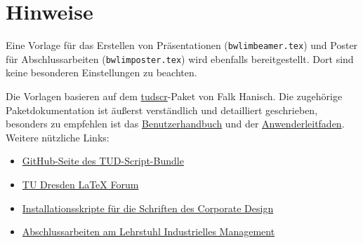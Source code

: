 \documentclass[final, english, ngerman, a4paper, 10pt, %
numbers=noenddot,
cd=true,
cdfont=false,cdfont=nohead,cdfont=nodin,
cdmath=false,
cdhead=false,
cdfoot=true,
cdcover=monochrome,
cdgeometry=symmetric,
declaration=heading,
declaration=notoc,
abstract=heading,
]{tudscrartcl}
\begin{document}
\section{Hinweise}

Eine Vorlage für das Erstellen von Präsentationen (\texttt{bwlimbeamer.tex}) und Poster für Abschlussarbeiten (\texttt{bwlimposter.tex}) wird ebenfalls bereitgestellt. Dort sind keine besonderen Einstellungen zu beachten.

Die Vorlagen basieren auf dem \href{https://www.ctan.org/pkg/tudscr?lang=en}{tudscr}-Paket von Falk Hanisch. Die zugehörige Paketdokumentation ist äußerst verständlich und detailliert geschrieben, besonders zu empfehlen ist das \href{http://mirrors.ctan.org/macros/latex/contrib/tudscr/doc/tudscr.pdf}{Benutzerhandbuch} und der \href{http://mirrors.ctan.org/macros/latex/contrib/tudscr/doc/tutorials/treatise.pdf}{Anwenderleitfaden}.
Weitere nützliche Links:
\begin{itemize}
	\item \href{https://github.com/tud-cd/tudscr}{GitHub-Seite des TUD-Script-Bundle}
	\item \href{https://latex.wcms-file3.tu-dresden.de/phpBB3/}{TU Dresden LaTeX Forum}
	\item \href{http://wwwpub.zih.tu-dresden.de/~fahan/tudscr/index.php}{Installationsskripte für die Schriften des Corporate Design}
	\item \href{https://tu-dresden.de/bu/wirtschaft/lim/studium/abschlussarbeiten}{Abschlussarbeiten am Lehrstuhl Industrielles Management}
\end{itemize}
	
\end{document}
